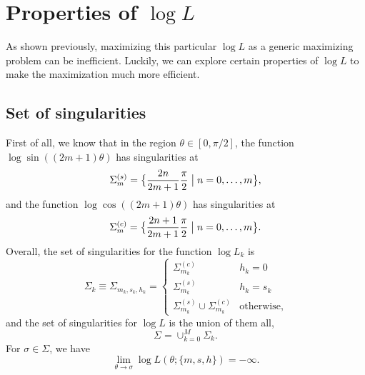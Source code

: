 \documentclass{article}
\begin{document}
\section{Properties of \texorpdfstring{$\log L$}{logL}}
As shown previously, maximizing this particular $\log L$
as a generic maximizing problem can be inefficient.  Luckily,
we can explore certain properties of $\log L$ to make the
maximization much more efficient.

\subsection{Set of singularities}
First of all, we know that 
in the region $\theta\in[0,\pi/2]$, the function $\log\sin((2m+1)\theta)$
has singularities at
\begin{equation}
  \Sigma_m^{(s)} = \bigl\{\frac{2n}{2m+1}\frac\pi2\bigm| n = 0, \ldots, m\bigr\},
\end{equation}
and the function $\log\cos((2m+1)\theta)$ has singularities at
\begin{equation}
  \Sigma_m^{(c)} = \bigl\{\frac{2n+1}{2m+1}\frac\pi2\bigm| n = 0, \ldots, m\bigr\}.
\end{equation}
Overall, the set of singularities for the function $\log L_k$ is
\begin{equation}
  \Sigma_k \equiv  \Sigma_{m_k,s_k,h_k} = \begin{cases}
    \Sigma_{m_k}^{(c)} & h_k = 0 \\
    \Sigma_{m_k}^{(s)} & h_k = s_k \\
    \Sigma_{m_k}^{(s)}\cup\Sigma_{m_k}^{(c)} & \text{otherwise},
    \end{cases}
\end{equation}
and the set of singularities for $\log L$ is the union of them all,
\begin{equation}
  \Sigma = \cup_{k=0}^M\Sigma_k.
\end{equation}
For $\sigma\in\Sigma$, we have
\begin{equation}
  \lim_{\theta\to\sigma} \log L(\theta; \{m,s,h\}) = -\infty.
\end{equation}
\end{document}
